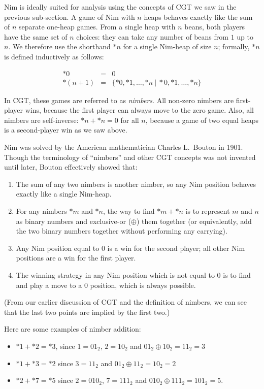 \documentclass[a4paper,twocolumn]{article}
\newcommand{\cgtgame}[2]{\{#1 \:|\: #2\}}
\begin{document}
Nim is ideally suited for analysis using the concepts of CGT we saw in
the previous sub-section. A game of Nim with $n$ heaps behaves exactly
like the sum of $n$ separate one-heap games. From a single heap with
$n$ beans, both players have the same set of $n$ choices: they can
take any number of beans from $1$ up to $n$. We therefore use the
shorthand $*n$ for a single Nim-heap of size $n$; formally, $*n$ is
defined inductively as follows:

\begin{eqnarray*}
  *0 & = & 0 \\
  *(n+1) & = & \cgtgame{*0, *1, \ldots, *n}{*0, *1, \ldots, *n}
\end{eqnarray*}

In CGT, these games are referred to as \emph{nimbers}. All non-zero
nimbers are first-player wins, because the first player can always
move to the zero game. Also, all nimbers are self-inverse: $*n + *n =
0$ for all $n$, because a game of two equal heaps is a second-player
win as we saw above.

Nim was solved by the American mathematician Charles L.\ Bouton in
1901. Though the terminology of ``nimbers'' and other CGT concepts was
not invented until later, Bouton effectively showed that:

\begin{enumerate}
  \item The sum of any two nimbers is another nimber, so any Nim
    position behaves exactly like a single Nim-heap.
  \item For any nimbers $*m$ and $*n$, the way to find $*m + *n$ is to
    represent $m$ and $n$ as binary numbers and exclusive-or
    ($\oplus$) them together (or equivalently, add the two binary
    numbers together without performing any carrying).
  \item Any Nim position equal to $0$ is a win for the second player;
    all other Nim positions are a win for the first player.
  \item The winning strategy in any Nim position which is not equal to
    $0$ is to find and play a move to a $0$ position, which is always
    possible.
\end{enumerate}

(From our earlier discussion of CGT and the definition of nimbers, we
can see that the last two points are implied by the first two.)

Here are some examples of nimber addition:

\begin{itemize}
  \item $*1 + *2 = *3$, since $1 = 01_2$, $2 = 10_2$ and $01_2 \oplus
    10_2 = 11_2 = 3$
  \item $*1 + *3 = *2$ since $3 = 11_2$ and $01_2 \oplus 11_2 = 10_2 =
    2$
  \item $*2 + *7 = *5$ since $2 = 010_2$, $7 = 111_2$ and $010_2
    \oplus 111_2 = 101_2 = 5$.
\end{itemize}
\end{document}

